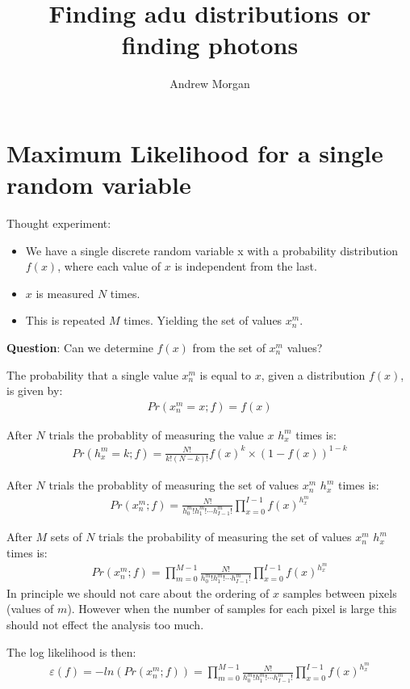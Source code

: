 \documentclass[11pt]{article}
\title{\textbf{Finding adu distributions or finding photons}}
\author{Andrew Morgan}
\date{}
\begin{document}
\maketitle

\section{Maximum Likelihood for a single random variable}
Thought experiment:

\begin{itemize}

  \item We have a single discrete random variable x with a probability distribution $f(x)$, where each value of $x$ is independent from the last. 
  \item $x$ is measured $N$ times.
  \item This is repeated $M$ times. Yielding the set of values $x^m_n$.

\end{itemize}

\textbf{Question}: Can we determine $f(x)$ from the set of $x^m_n$ values?

The probability that a single value $x^m_n$ is equal to $x$, given a distribution $f(x)$, is given by:
\begin{align}
   Pr(x^m_n = x; f) = f(x)
\end{align}

After $N$ trials the probablity of measuring the value $x$ $h^m_x$ times is:
\begin{align}
   Pr(h^m_x = k; f) = \frac{N!}{k!(N-k)!} f(x)^k \times (1-f(x))^{1-k}
\end{align}

After $N$ trials the probablity of measuring the set of values $x^m_n$ $h^m_x$ times is:
\begin{align}
   Pr(x^m_n; f) = \frac{N!}{h^m_0! h^m_1! \cdots h^m_{I-1}!} \prod_{x=0}^{I-1} f(x)^{h^m_{x}}
\end{align}


After $M$ sets of $N$ trials the probability of measuring the set of values $x^m_n$ $h^m_x$ times is:
\begin{align}
   Pr(x^m_n; f) = \prod_{m=0}^{M-1}\frac{N!}{h^m_0! h^m_1! \cdots h^m_{I-1}!} \prod_{x=0}^{I-1} f(x)^{h^m_{x}}
\end{align}
In principle we should not care about the ordering of $x$ samples between pixels (values of $m$). However when the number of samples for each pixel is large this should not effect the analysis too much. 

The log likelihood is then:
\begin{align}
   \varepsilon(f) = -ln(Pr(x^m_n; f)) = \prod_{m=0}^{M-1}\frac{N!}{h^m_0! h^m_1! \cdots h^m_{I-1}!} \prod_{x=0}^{I-1} f(x)^{h^m_{x}}
\end{align}
\end{document}
